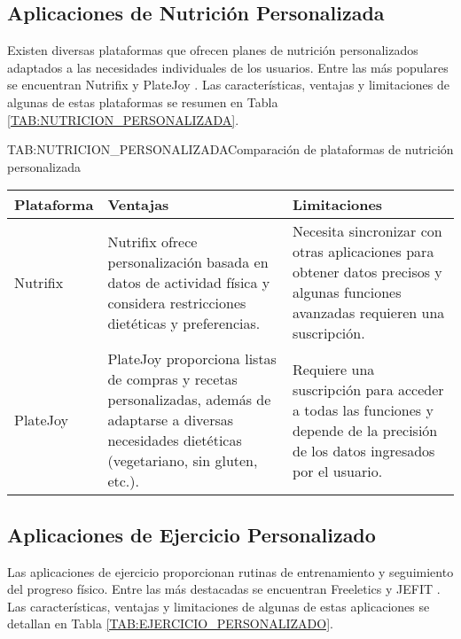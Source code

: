 \subsection{Aplicaciones de Nutrición Personalizada}

Existen diversas plataformas que ofrecen planes de nutrición personalizados adaptados a las necesidades individuales de los usuarios. Entre las más populares se encuentran Nutrifix \cite{Nutrifix} y PlateJoy \cite{PlateJoy}. Las características, ventajas y limitaciones de algunas de estas plataformas se resumen en Tabla \ref{TAB:NUTRICION_PERSONALIZADA}.

\begin{table}[Plataformas de Nutrición Personalizada]{TAB:NUTRICION_PERSONALIZADA}{Comparación de plataformas de nutrición personalizada}
  \begin{tabular}{|p{3cm}|p{5cm}|p{5cm}|}
    \hline
    \textbf{Plataforma} & \textbf{Ventajas} & \textbf{Limitaciones} \\
    \hline
    Nutrifix & Nutrifix ofrece personalización basada en datos de actividad física y considera restricciones dietéticas y preferencias. & Necesita sincronizar con otras aplicaciones para obtener datos precisos y algunas funciones avanzadas requieren una suscripción. \\
    \hline
    PlateJoy & PlateJoy proporciona listas de compras y recetas personalizadas, además de adaptarse a diversas necesidades dietéticas (vegetariano, sin gluten, etc.). & Requiere una suscripción para acceder a todas las funciones y depende de la precisión de los datos ingresados por el usuario. \\
    \hline
  \end{tabular}
\end{table}

\subsection{Aplicaciones de Ejercicio Personalizado}

Las aplicaciones de ejercicio proporcionan rutinas de entrenamiento y seguimiento del progreso físico. Entre las más destacadas se encuentran Freeletics \cite{Freeletics} y JEFIT \cite{JEFIT}. Las características, ventajas y limitaciones de algunas de estas aplicaciones se detallan en Tabla \ref{TAB:EJERCICIO_PERSONALIZADO}.

